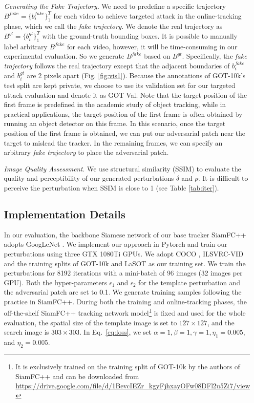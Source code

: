 \documentclass[journal]{IEEEtran}
\renewcommand{\uline}{}
\begin{document}
\textit{Generating the Fake Trajectory.} We need to predefine a specific trajectory $B^{fake}=\{b^{fake}_i\}_1^{T}$ for each video to achieve targeted attack in the online-tracking phase, which we call the \textit{fake trajectory}. We denote the real trajectory as $B^{gt}=\{b^{gt}_i\}_1^T$ with the \uline{ground-truth} bounding boxes. It is possible to manually label arbitrary $B^{fake}$ for each video, however, it will be time-consuming in our experimental evaluation. So we generate $B^{fake}$ based on $B^{gt}$. Specifically, the \textit{fake trajectory} follows the real trajectory except that the adjacent boundaries of $b^{fake}_i$ and $b^{gt}_i$ are 2 pixels apart (Fig. \ref{fig:vis1}). Because the annotations of GOT-10k's test split are kept private, we choose to use its validation set for our targeted attack evaluation and denote it as GOT-Val. Note that the target position of the first frame is \uline{predefined} in the academic study of object tracking, while in practical \uline{applications}, the target position of the first frame is often obtained by running an object detector on this frame. In this scenario, once the target position of the first frame is obtained, we can put our adversarial patch near the target to mislead the tracker. In the remaining frames, we can specify an arbitrary \textit{fake trajectory} to place the adversarial patch.

\textit{Image Quality Assessment.} We use structural similarity (SSIM) \cite{SSIM} to evaluate the quality and perceptibility of our generated perturbations $\delta$ and $p$. It is difficult to perceive the perturbation when SSIM is close to 1 (see Table \ref{tab:iter}).

\subsection{Implementation Details}

In our evaluation, the backbone Siamese network of our base tracker SiamFC++ \cite{SiamFC++} adopts GoogLeNet \cite{GoogLeNet}. We implement our approach in Pytorch and train our perturbations using three GTX 1080Ti GPUs. We adopt COCO \cite{COCO}, ILSVRC-VID \cite{VID} and the training splits of GOT-10k \cite{GOT-10k} and LaSOT \cite{LaSOT} as our training set. We train the perturbations for 8192 iterations with a mini-batch of 96 images (32 images per GPU). Both the hyper-parameters $\epsilon_1$ and $\epsilon_2$ for the template perturbation and the adversarial patch are set to 0.1. We generate training samples following the practice in SiamFC++. During both the training and online-tracking \uline{phases}, the off-the-shelf SiamFC++ tracking network model\footnote{It is exclusively trained on the training split of GOT-10k by the authors of SiamFC++ and can be downloaded from \url{https://drive.google.com/file/d/1BevcIEZr_kgyFjhxayOFw08DFl2u5Zi7/view}} is fixed and used for the whole evaluation, the spatial size of the template image is set to $127\times 127$, and the search image is $303\times 303$. In Eq.~\eqref{eq:loss}, we set $\alpha=1, \beta=1, \gamma=1, \eta_1=0.005$, and $\eta_2=0.005$.
\end{document}
